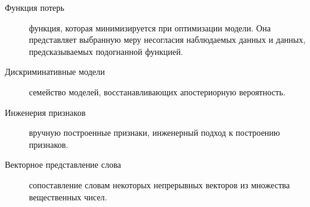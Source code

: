 \Defines
\begin{description}
\item[Функция потерь] функция, которая минимизируется при оптимизации модели. Она представляет выбранную меру несогласия наблюдаемых данных и данных, предсказываемых подогнанной функцией.
\item[Дискриминативные модели] семейство моделей, восстанавливающих апостериорную вероятность.
\item[Инженерия признаков] вручную построенные признаки, инженерный подход к построению признаков.
\item[Векторное представление слова] сопоставление словам некоторых непрерывных векторов из множества вещественных чисел.
\end{description}

